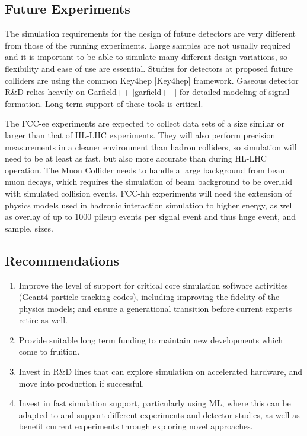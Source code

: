 \documentclass[10pt,a4paper]{article}
\begin{document}
\subsection{Future Experiments}\label{future-experiments}

The simulation requirements for the design of future detectors are very
different from those of the running experiments. Large samples are not
usually required and it is important to be able to simulate many
different design variations, so flexibility and ease of use are
essential. Studies for detectors at proposed future colliders are using
the common Key4hep {[}Key4hep{]} framework. Gaseous detector R\&D relies
heavily on Garfield++ {[}garfield++{]} for detailed modeling of signal
formation. Long term support of these tools is critical.

The FCC-ee experiments are expected to collect data sets of a size
similar or larger than that of HL-LHC experiments. They will also
perform precision measurements in a cleaner environment than hadron
colliders, so simulation will need to be at least as fast, but also more
accurate than during HL-LHC operation. The Muon Collider needs to handle
a large background from beam muon decays, which requires the simulation
of beam background to be overlaid with simulated collision events.
FCC-hh experiments will need the extension of physics models used in
hadronic interaction simulation to higher energy, as well as overlay of
up to 1000 pileup events per signal event and thus huge event, and
sample, sizes.

\subsection{Recommendations}\label{recommendations-1}

\begin{enumerate}
\def\labelenumi{\arabic{enumi}.}
\item
  Improve the level of support for critical core simulation software
  activities (Geant4 particle tracking codes), including improving the
  fidelity of the physics models; and ensure a generational transition
  before current experts retire as well.
\item
  Provide suitable long term funding to maintain new developments which
  come to fruition.
\item
  Invest in R\&D lines that can explore simulation on accelerated
  hardware, and move into production if successful.
\item
  Invest in fast simulation support, particularly using ML, where this
  can be adapted to and support different experiments and detector
  studies, as well as benefit current experiments through exploring
  novel approaches.
\end{enumerate}
\end{document}
